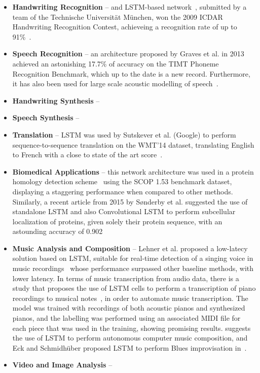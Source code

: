 \begin{itemize}
    \item \textbf{Handwriting Recognition} -- and LSTM-based network~\cite{Bertolami09}, submitted by a team of the Technische Universität München, won the 2009 ICDAR Handwriting Recognition Contest, achieveing a recognition rate of up to 91\%~\cite{ICDAR09}.
    \item \textbf{Speech Recognition} -- an architecture\cite{Graves13} proposed by Graves et al. in 2013 achieved an astonishing 17.7\% of accuracy on the TIMT Phoneme Recognition Benchmark, which up to the date is a new record. Furthermore, it has also been used for large scale acoustic modelling of speech~\cite{Sak14}.
    \item \textbf{Handwriting Synthesis} -- 
    \item \textbf{Speech Synthesis} --
    \item \textbf{Translation} -- LSTM was used by Sutskever et al. (Google) to perform sequence-to-sequence translation on the WMT'14 dataset, translating English to French with a close to state of the art score~\cite{Sustkever14}.

    \item \textbf{Biomedical Applications} -- this network architecture was used in a protein homology detection scheme~\cite{Hochreiter07} using the SCOP 1.53 benchmark dataset, displaying a staggering performance when compared to other methods. Similarly, a recent article from 2015 by Sønderby et al. suggested the use of standalone LSTM and also Convolutional LSTM to perform subcellular localization of proteins, given solely their protein sequence, with an astounding accuracy of 0.902~\cite{Sonderby15}

    \item \textbf{Music Analysis and Composition} -- Lehner et al. proposed a low-latecy solution based on LSTM, suitable for real-time detection of a singing voice in music recordings~\cite{Lehner15} whose performance surpassed other baseline methods, with lower latency. 
        In terms of music transcription from audio data, there is a study that proposes the use of LSTM cells to perform a transcription of piano recordings to musical notes~\cite{Bock12}, in order to automate music transcription. The model was trained with recordings of both acoustic pianos and synthesized pianos, and the labelling was performed using an associated MIDI file for each piece that was used in the training, showing promising results. \cite{Coca13} suggests the use of LSTM to perform autonomous computer music composition, and Eck and Schmidhüber proposed LSTM to perform Blues improvisation in~\cite{Eck02}.

    \item \textbf{Video and Image Analysis} -- 


\end{itemize}




